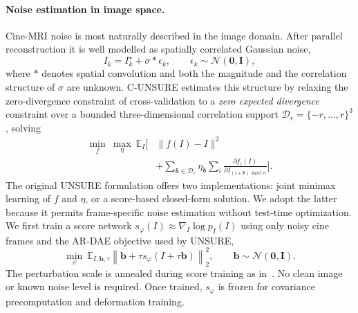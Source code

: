 \documentclass[10pt,twocolumn]{article}
\newcommand{\E}{\mathbb{E}}
\begin{document}
\paragraph{Noise estimation in image space.}
Cine-MRI noise is most naturally described in the image domain. After parallel reconstruction it is well modelled as spatially correlated Gaussian noise,
\begin{equation}
    I_k = I_k^\star + \sigma \ast \epsilon_k,
    \qquad \epsilon_k \sim \mathcal{N}(\bm{0}, \bm{I}),
    \label{eq:img_noise}
\end{equation}
where $\ast$ denotes spatial convolution and both the magnitude and the correlation structure of $\sigma$ are unknown. C-UNSURE estimates this structure by relaxing the zero-divergence constraint of cross-validation to a \emph{zero expected divergence} constraint over a bounded three-dimensional correlation support $\mathcal{D}_r=\{-r,\ldots,r\}^{3}$, solving
\begin{equation}
\begin{aligned}
    \min_{f}\ \max_{\eta}\ \E_{I}\!\Bigg[
        &\|f(I) - I\|^2 \\
        &+ \sum_{\bm{\delta}\in\mathcal{D}_r} \eta_{\bm{\delta}}
        \sum_{i}\frac{\partial f_i(I)}
        {\partial I_{(i+\bm{\delta})\bmod n}}
    \Bigg].
\end{aligned}
    \label{eq:cunsure}
\end{equation}
The original UNSURE formulation offers two implementations: joint minimax learning of $f$ and $\eta$, or a score-based closed-form solution. We adopt the latter because it permits frame-specific noise estimation without test-time optimization. We first train a score network $s_{\varphi}(I)\approx\nabla_I\log p_I(I)$ using only noisy cine frames and the AR-DAE objective used by UNSURE,
\begin{equation}
    \min_{\varphi}\
    \E_{I,\bm{b},\tau}
    \left\|\bm{b}+\tau s_{\varphi}(I+\tau\bm{b})\right\|_2^2,
    \qquad \bm{b}\sim\mathcal{N}(\bm{0},\bm{I}).
    \label{eq:score_training}
\end{equation}
The perturbation scale is annealed during score training as in~\cite{tachella2025unsure}. No clean image or known noise level is required. Once trained, $s_{\varphi}$ is frozen for covariance precomputation and deformation training.
\end{document}

